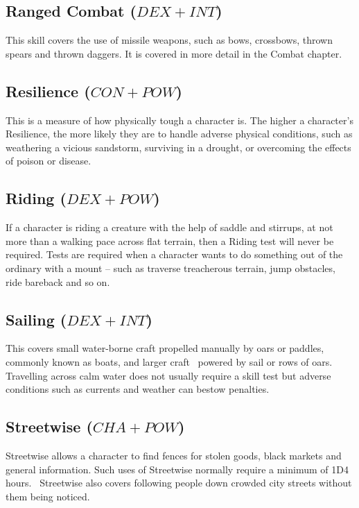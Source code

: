 \subsection{Ranged Combat ($DEX+INT$)}
This skill covers the use of missile weapons, such as bows, crossbows, thrown spears and thrown daggers. It is covered in more detail in the Combat chapter.

\subsection{Resilience ($CON+POW$)}
This is a measure of how physically tough a character is. The higher a character’s Resilience, the more likely they are to handle adverse physical conditions, such as weathering a vicious sandstorm, surviving in a drought, or overcoming the effects of poison or disease. 


\subsection{Riding ($DEX+POW$)}
If a character is riding a creature with the help of saddle and stirrups, at not more than a walking pace across flat terrain, then a Riding test will never be required. Tests are required when a character wants to do something out of the ordinary with a mount – such as traverse treacherous terrain, jump obstacles, ride bareback and so on. 



\subsection{Sailing ($DEX+INT$)}
This covers small water-borne craft propelled manually by oars or paddles, commonly known as boats, and larger craft  powered by sail or rows of oars. Travelling across calm water does not usually require a skill test but adverse conditions such as currents and weather can bestow penalties. 

\subsection{Streetwise ($CHA+POW$)}
Streetwise allows a character to find fences for stolen goods, black markets and general information. Such uses of Streetwise normally require a minimum of 1D4 hours.  Streetwise also covers following people down crowded city streets without them being noticed.

